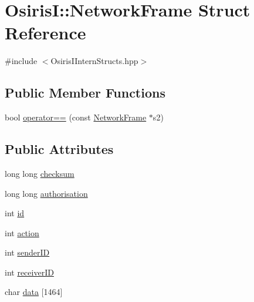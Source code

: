 \hypertarget{struct_osiris_i_1_1_network_frame}{\section{Osiris\-I\-:\-:Network\-Frame Struct Reference}
\label{struct_osiris_i_1_1_network_frame}
}


{\ttfamily \#include $<$Osiris\-I\-Intern\-Structs.\-hpp$>$}

\subsection*{Public Member Functions}
\begin{DoxyCompactItemize}
\item 
bool \hyperlink{struct_osiris_i_1_1_network_frame_aae067c2329b2a285f4d25cf4748f6502}{operator==} (const \hyperlink{struct_osiris_i_1_1_network_frame}{Network\-Frame} $\ast$s2)
\end{DoxyCompactItemize}
\subsection*{Public Attributes}
\begin{DoxyCompactItemize}
\item 
long long \hyperlink{struct_osiris_i_1_1_network_frame_ab1e96cbf438c5ccefd9bbf304cf18a7d}{checksum}
\item 
long long \hyperlink{struct_osiris_i_1_1_network_frame_a88485c91ed4e6b7c221363cce313a9de}{authorisation}
\item 
int \hyperlink{struct_osiris_i_1_1_network_frame_a5dbb0988b7c76dbfdbc2a8958838cbdf}{id}
\item 
int \hyperlink{struct_osiris_i_1_1_network_frame_a4e084672ee51d6b287eebaa7f4c507ff}{action}
\item 
int \hyperlink{struct_osiris_i_1_1_network_frame_acbde9a1c03f58f4106d2aaadc1716f6d}{sender\-I\-D}
\item 
int \hyperlink{struct_osiris_i_1_1_network_frame_afca674408d3699421b3307bfaeea0f1d}{receiver\-I\-D}
\item 
char \hyperlink{struct_osiris_i_1_1_network_frame_ae4c540f231e7b4b8f0522e8415936174}{data} \mbox{[}1464\mbox{]}
\end{DoxyCompactItemize}


